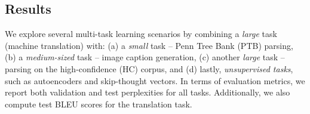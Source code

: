 \begin{table}%
\centering
{}
\caption{{\bf Data \& Training Details} -- Information about the different
datasets used in this work. For each task, we display the following
statistics: (a) the number of training examples, (b) the sizes of the
vocabulary, (c) the number of training epochs, and (d) details on when
and how frequent we halve the learning rates ({\it finetuning}).}
\label{t:tasks} 
\end{table}

\subsection{Results}
We explore several multi-task learning scenarios by combining a {\it
large} task (machine translation) with: (a) a {\it small} task -- Penn
Tree Bank (PTB) parsing, (b) a {\it medium-sized} task -- image
caption generation, (c) another {\it large} task -- parsing on the
high-confidence (HC) corpus, and (d) lastly, {\it unsupervised tasks},
such as autoencoders and skip-thought vectors. In terms of evaluation metrics,
we report both validation and test perplexities for all tasks. Additionally, we
also compute test BLEU scores \citep{Papineni02bleu} for the translation task.

